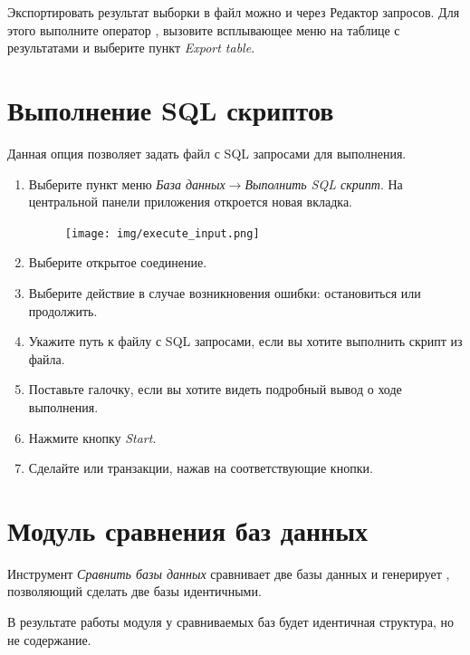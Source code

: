 \begin{redremark}
	Экспортировать результат выборки в файл можно и через Редактор запросов. Для этого выполните оператор , вызовите всплывающее меню на таблице с результатами и выберите пункт \textit{Export table}.
\end{redremark} 

\newpage

\section{Выполнение SQL скриптов}\label{sec:execute_scripts}

Данная опция позволяет задать файл с SQL запросами для выполнения.

\begin{enumerate}[leftmargin=39pt]
	\item Выберите пункт меню \textit{База данных}$\rightarrow$\textit{Выполнить SQL скрипт}. На центральной панели приложения откроется новая вкладка.
	\begin{figure}[H]
		\flushright
		\texttt{[image: img/execute\_input.png]}
	\end{figure}
	\item Выберите открытое соединение.
	\item Выберите действие в случае возникновения ошибки: остановиться или продолжить.
	\item Укажите путь к файлу с SQL запросами, если вы хотите выполнить скрипт из файла.
	\item Поставьте галочку, если вы хотите видеть подробный вывод о ходе выполнения.
	\item Нажмите кнопку \textit{Start}.
	\item Сделайте  или  транзакции, нажав на соответствующие кнопки.
\end{enumerate}

\newpage

\section{Модуль сравнения баз данных}\label{sec:compareDB_module}

Инструмент \textit{Сравнить базы данных} сравнивает две базы данных и генерирует , позволяющий сделать две базы идентичными. 

\begin{redimportant}
	В результате работы модуля у сравниваемых баз будет идентичная структура, но не содержание.
\end{redimportant}	


